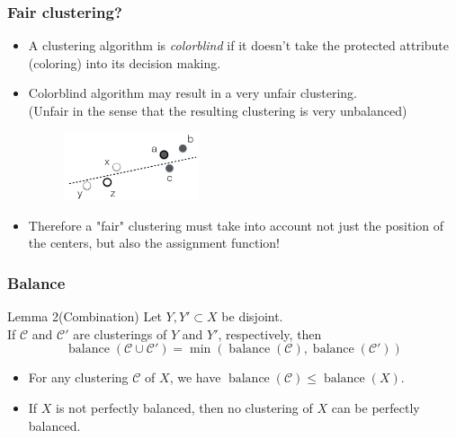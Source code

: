 \documentclass{beamer}
\DeclareMathOperator{\balance}{balance}
\begin{document}


\begin{frame}
\frametitle{Fair clustering?}

\begin{itemize}
	\item A clustering algorithm is {\it colorblind} if it doesn't take the protected attribute (coloring) into its decision making. \pause
	\item Colorblind algorithm may result in a very unfair clustering.\\
	(Unfair in the sense that the resulting clustering is very unbalanced)
		\begin{figure}[hbt]
  			\includegraphics[height=2cm]{fig1.png}
		\end{figure} \pause

	\item Therefore a "fair" clustering must take into account not just the position of the centers, but also the assignment function!

\end{itemize}

\end{frame}



\begin{frame}
\frametitle{Balance}

\begin{block}{Lemma 2(Combination)}
Let $Y, Y' \subset X$ be disjoint.\\
If $\mathcal{C}$ and $\mathcal{C}'$ are clusterings of $Y$ and $Y'$, respectively, then
$$\balance(\mathcal{C} \cup \mathcal{C}') = \min(\balance(\mathcal{C}), \balance(\mathcal{C}'))$$
\end{block}

\begin{itemize}
	\item For any clustering $\mathcal{C}$ of $X$, we have $\balance(\mathcal{C}) \leq \balance(X)$.
	\item If $X$ is not perfectly balanced, then no clustering of $X$ can be perfectly balanced.
\end{itemize}

\end{frame}
\end{document}
